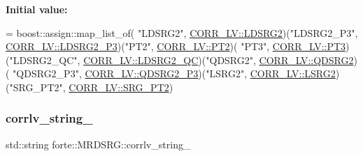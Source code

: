 {\bfseries Initial value\+:}
\begin{DoxyCode}
= boost::assign::map\_list\_of(
        \textcolor{stringliteral}{"LDSRG2"}, \mbox{\hyperlink{classforte_1_1_m_r_d_s_r_g_a9219681e8d6714e73b1921325668c17aa24dbc64461c4bd5e7f00f2742bc02943}{CORR\_LV::LDSRG2}})(\textcolor{stringliteral}{"LDSRG2\_P3"}, 
      \mbox{\hyperlink{classforte_1_1_m_r_d_s_r_g_a9219681e8d6714e73b1921325668c17aa75eb5b706808a1ac112843dcc534ef30}{CORR\_LV::LDSRG2\_P3}})(\textcolor{stringliteral}{"PT2"}, \mbox{\hyperlink{classforte_1_1_m_r_d_s_r_g_a9219681e8d6714e73b1921325668c17aa5c5b1c4940e28be34a06e78f37ee685a}{CORR\_LV::PT2}})(
        \textcolor{stringliteral}{"PT3"}, \mbox{\hyperlink{classforte_1_1_m_r_d_s_r_g_a9219681e8d6714e73b1921325668c17aa091a026171c11dbb4ae1428c44daf201}{CORR\_LV::PT3}})(\textcolor{stringliteral}{"LDSRG2\_QC"}, \mbox{\hyperlink{classforte_1_1_m_r_d_s_r_g_a9219681e8d6714e73b1921325668c17aa852a93207553b725f17b8e1d921bbe6f}{CORR\_LV::LDSRG2\_QC}})(\textcolor{stringliteral}{"QDSRG2"}, 
      \mbox{\hyperlink{classforte_1_1_m_r_d_s_r_g_a9219681e8d6714e73b1921325668c17aa1d36935f81e092898e7f382690cf302e}{CORR\_LV::QDSRG2}})(
        \textcolor{stringliteral}{"QDSRG2\_P3"}, \mbox{\hyperlink{classforte_1_1_m_r_d_s_r_g_a9219681e8d6714e73b1921325668c17aa79a9ea4fea4a8fcdd204ca01e6743f81}{CORR\_LV::QDSRG2\_P3}})(\textcolor{stringliteral}{"LSRG2"}, 
      \mbox{\hyperlink{classforte_1_1_m_r_d_s_r_g_a9219681e8d6714e73b1921325668c17aa1e86efde135a9a53c5b4ead3216bbe02}{CORR\_LV::LSRG2}})(\textcolor{stringliteral}{"SRG\_PT2"}, \mbox{\hyperlink{classforte_1_1_m_r_d_s_r_g_a9219681e8d6714e73b1921325668c17aa7707ef07af865c1e3bd777e053fa8104}{CORR\_LV::SRG\_PT2}})
\end{DoxyCode}
\mbox{\label{classforte_1_1_m_r_d_s_r_g_a11e1382fc9152eff43912c6888f4dfe1}} 
\subsubsection{\texorpdfstring{corrlv\+\_\+string\+\_\+}{corrlv\_string\_}}
{\footnotesize\ttfamily std\+::string forte\+::\+M\+R\+D\+S\+R\+G\+::corrlv\+\_\+string\+\_\+\hspace{0.3cm}{\ttfamily [protected]}}



